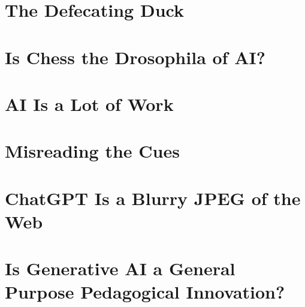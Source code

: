 \documentclass[openany]{book}
\begin{document}
\chapter{The Defecating Duck}


\chapter{Is Chess the Drosophila of AI?}


\chapter{AI Is a Lot of Work}


\chapter{Misreading the Cues}


\chapter{ChatGPT Is a Blurry JPEG of the Web}


\chapter{Is Generative AI a General Purpose Pedagogical Innovation?}

\end{document}

